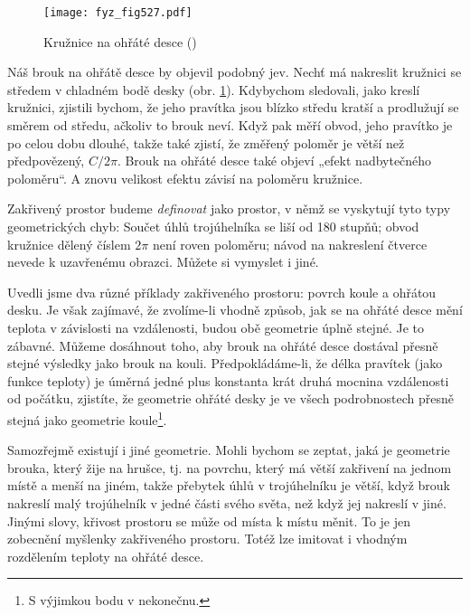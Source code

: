     \begin{figure}[ht!] %
      \centering
      \texttt{[image: fyz\_fig527.pdf]}
      \caption{Kružnice na ohřáté desce
               (\cite[s.~779]{Feynman02})}
      \label{fyz:fig527}
    \end{figure}
    
    Náš brouk na ohřátě desce by objevil podobný jev. Nechť má nakreslit kružnici se středem v 
    chladném bodě desky (obr. \ref{fyz:fig527}). Kdybychom sledovali, jako kreslí kružnici, 
    zjistili bychom, že jeho pravítka jsou blízko středu kratší a prodlužují se směrem od středu, 
    ačkoliv to brouk neví. Když pak měří obvod, jeho pravítko je po celou dobu dlouhé, takže také 
    zjistí, že změřený poloměr je větší než předpovězený, \(C/2\pi\). Brouk na ohřáté desce také 
    objeví „efekt nadbytečného poloměru“. A znovu velikost efektu závisí na poloměru kružnice.
    
    Zakřivený prostor budeme \emph{definovat} jako prostor, v němž se vyskytují tyto typy 
    geometrických chyb: Součet úhlů trojúhelníka se liší od \num{180} stupňů; obvod kružnice dělený 
    číslem \(2\pi\) není roven poloměru; návod na nakreslení čtverce nevede k uzavřenému obrazci. 
    Můžete si vymyslet i jiné.
    
    Uvedli jsme dva různé příklady zakřiveného prostoru: povrch koule a ohřátou desku. Je však 
    zajímavé, že zvolíme-li vhodně způsob, jak se na ohřáté desce mění teplota v závislosti na 
    vzdálenosti, budou obě geometrie úplně stejné. Je to zábavné. Můžeme dosáhnout toho, aby brouk 
    na ohřáté desce dostával přesně stejné výsledky jako brouk na kouli. Předpokládáme-li, že délka 
    pravítek (jako funkce teploty) je úměrná jedné plus konstanta krát druhá mocnina vzdálenosti od 
    počátku, zjistíte, že geometrie ohřáté desky je ve všech podrobnostech přesně stejná jako 
    geometrie koule\footnote{S výjimkou bodu v nekonečnu.}. 
    
    Samozřejmě existují i jiné geometrie. Mohli bychom se zeptat, jaká je geometrie brouka, který 
    žije na hrušce, tj. na povrchu, který má větší zakřivení na jednom místě a menší na jiném, 
    takže přebytek úhlů v trojúhelníku je větší, když brouk nakreslí malý trojúhelník v jedné části 
    svého světa, než když jej nakreslí v jiné. Jinými slovy, křivost prostoru se může od místa k 
    místu měnit. To je jen zobecnění myšlenky zakřiveného prostoru. Totéž lze imitovat i vhodným 
    rozdělením teploty na ohřáté desce. 
    
